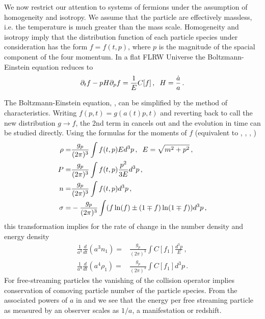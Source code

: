 We now restrict our attention to  systems of fermions under the assumption of homogeneity and isotropy. We assume that the particle are effectively massless,  i.e. the temperature is much greater than the mass scale.  Homogeneity and isotropy imply that the distribution function of each particle species under consideration has the form $f=f(t,p)$, where $p$ is the magnitude of the spacial component of the four momentum.  In a flat FLRW Universe the Boltzmann-Einstein equation reduces to
\begin{equation}\label{boltzmann:p}
\partial_t f-pH \partial_p f=\frac{1}{E}C[f]\,,\hspace{2mm} H=\frac{\dot{a}}{a}\,.
\end{equation}

The Boltzmann-Einstein equation, , can be simplified by the method of characteristics. Writing $f(p, t)=g(a(t)p,t)$ and reverting back to call the new distribution $g\to f$, the 2nd term in  cancels out and the evolution in time can be studied directly.  Using the formulas for the moments of $f$ (equivalent to , , , )
\begin{align}\label{moments}
\rho=&\frac{g_p}{(2\pi)^3}\int f(t,p)Ed^3p\,, \hspace{2mm} E=\sqrt{m^2+p^2}\,,\\
P=&\frac{g_p}{(2\pi)^3}\int f(t,p)\frac{p^2}{3E}d^3p\,,\\
n=&\frac{g_p}{(2\pi)^3}\int f(t,p) d^3p\,,\\
\sigma=&-\frac{g_p}{(2\pi)^3}\int (f\ln(f)\pm(1\mp f)\ln(1\mp f)) d^3p\,,
\end{align}
this transformation implies for the rate of change in the   number density and energy density
\begin{align}\label{n:div}
\frac{1}{a^3}\frac{d}{dt}(a^3n_1)=&\frac{g_p}{(2\pi)^3}\int C[f_1] \frac{d^3p}{E}\,,\\
\label{rho:div}
\frac{1}{a^4}\frac{d}{dt}(a^4\rho_1)=&\frac{g_p}{(2\pi)^3}\int C[f_1] d^3p \,.
\end{align} 
For free-streaming particles the vanishing of the collision operator implies conservation of comoving particle number of the particle species. From the associated powers of $a$ in  and  we see that the energy per free streaming particle as measured by an observer scales as $1/a$, a manifestation or redshift.



